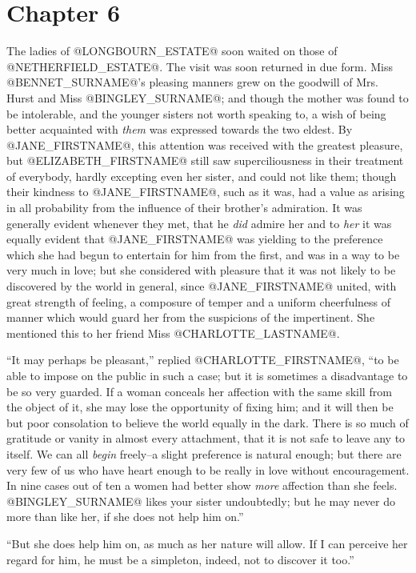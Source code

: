 \chapter*{Chapter 6}


The ladies of @LONGBOURN_ESTATE@ soon waited on those of @NETHERFIELD_ESTATE@. The visit
was soon returned in due form. Miss @BENNET_SURNAME@'s pleasing manners grew on
the goodwill of Mrs. Hurst and Miss @BINGLEY_SURNAME@; and though the mother was
found to be intolerable, and the younger sisters not worth speaking to,
a wish of being better acquainted with \textit{them} was expressed towards
the two eldest. By @JANE_FIRSTNAME@, this attention was received with the greatest
pleasure, but @ELIZABETH_FIRSTNAME@ still saw superciliousness in their treatment
of everybody, hardly excepting even her sister, and could not like them;
though their kindness to @JANE_FIRSTNAME@, such as it was, had a value as arising in
all probability from the influence of their brother's admiration. It
was generally evident whenever they met, that he \textit{did} admire her and
to \textit{her} it was equally evident that @JANE_FIRSTNAME@ was yielding to the preference
which she had begun to entertain for him from the first, and was in a
way to be very much in love; but she considered with pleasure that it
was not likely to be discovered by the world in general, since @JANE_FIRSTNAME@
united, with great strength of feeling, a composure of temper and a
uniform cheerfulness of manner which would guard her from the suspicions
of the impertinent. She mentioned this to her friend Miss @CHARLOTTE_LASTNAME@.

``It may perhaps be pleasant,'' replied @CHARLOTTE_FIRSTNAME@, ``to be able to impose
on the public in such a case; but it is sometimes a disadvantage to be
so very guarded. If a woman conceals her affection with the same skill
from the object of it, she may lose the opportunity of fixing him; and
it will then be but poor consolation to believe the world equally in
the dark. There is so much of gratitude or vanity in almost every
attachment, that it is not safe to leave any to itself. We can all
\textit{begin} freely--a slight preference is natural enough; but there are
very few of us who have heart enough to be really in love without
encouragement. In nine cases out of ten a women had better show \textit{more}
affection than she feels. @BINGLEY_SURNAME@ likes your sister undoubtedly; but he
may never do more than like her, if she does not help him on.''

``But she does help him on, as much as her nature will allow. If I can
perceive her regard for him, he must be a simpleton, indeed, not to
discover it too.''

